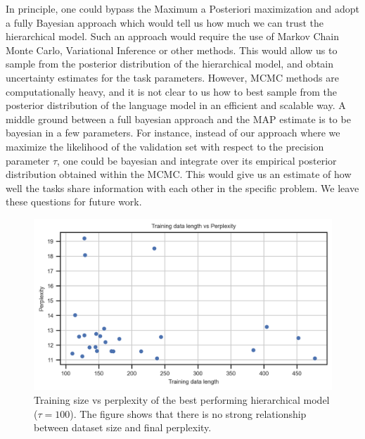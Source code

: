 \documentclass{article}
\begin{document}
In principle, one could bypass the Maximum a Posteriori maximization and adopt a fully Bayesian approach which would tell us how much we can trust the hierarchical model. Such an approach  would require the use of Markov Chain Monte Carlo, Variational Inference or other methods.
This would allow us to sample from the posterior distribution of the hierarchical model, and obtain uncertainty estimates for the task parameters.
However, MCMC methods are computationally heavy, and it is not clear to us how to best sample from the posterior distribution of the language model in an efficient and scalable way.
A middle ground between a full bayesian approach and the MAP estimate is to be bayesian in a few parameters. For instance, instead of our approach where we maximize the likelihood of the validation set with respect to the precision parameter $\tau$, one could be bayesian and integrate over its empirical posterior distribution obtained within the MCMC. This would give us an estimate of how well the tasks share information with each other in the specific problem.
We leave these questions for future work.

\begin{figure}
    \centering
    \includegraphics[width=\textwidth]{figures/trainingsize_vs_perplexity.png}
    \caption{Training size vs perplexity of the best performing hierarchical model ($\tau = 100$). The figure shows that there is no strong relationship between dataset size and final perplexity.}
    \label{fig:absolute_improvement}
\end{figure}

\end{document}
